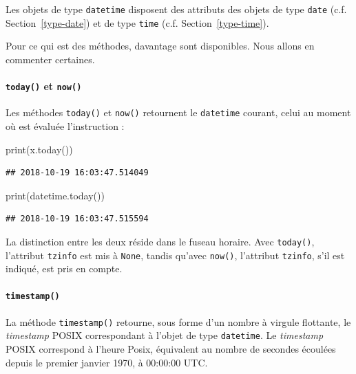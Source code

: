 \documentclass[12pt,]{book}
\newenvironment{Shaded}{\begin{snugshade}}{\end{snugshade}}
\newcommand{\BuiltInTok}[1]{#1}
\newcommand{\NormalTok}[1]{#1}
\let\oldparagraph\paragraph
\renewcommand{\paragraph}[1]{\oldparagraph{#1}\mbox{}}
\numberwithin{equation}{section}
\numberwithin{countremarque}{section}
\begin{document}
Les objets de type \texttt{datetime} disposent des attributs des objets
de type \texttt{date} (c.f. Section~\ref{type-date}) et de type
\texttt{time} (c.f. Section~\ref{type-time}).

Pour ce qui est des méthodes, davantage sont disponibles. Nous allons en
commenter certaines.

\paragraph{\texorpdfstring{\texttt{today()} et
\texttt{now()}}{today() et now()}}\label{today-et-now}

Les méthodes \texttt{today()} et \texttt{now()} retournent le
\texttt{datetime} courant, celui au moment où est évaluée l'instruction
:

\begin{Shaded}
\begin{Highlighting}[]
\BuiltInTok{print}\NormalTok{(x.today())}
\end{Highlighting}
\end{Shaded}

\begin{lstlisting}
## 2018-10-19 16:03:47.514049
\end{lstlisting}

\begin{Shaded}
\begin{Highlighting}[]
\BuiltInTok{print}\NormalTok{(datetime.today())}
\end{Highlighting}
\end{Shaded}

\begin{lstlisting}
## 2018-10-19 16:03:47.515594
\end{lstlisting}

La distinction entre les deux réside dans le fuseau horaire. Avec
\texttt{today()}, l'attribut \texttt{tzinfo} est mis à \texttt{None},
tandis qu'avec \texttt{now()}, l'attribut \texttt{tzinfo}, s'il est
indiqué, est pris en compte.

\paragraph{\texorpdfstring{\texttt{timestamp()}}{timestamp()}}\label{timestamp}

La méthode \texttt{timestamp()} retourne, sous forme d'un nombre à
virgule flottante, le \emph{timestamp} POSIX correspondant à l'objet de
type \texttt{datetime}. Le \emph{timestamp} POSIX correspond à l'heure
Posix, équivalent au nombre de secondes écoulées depuis le premier
janvier 1970, à 00:00:00 UTC.
\end{document}
